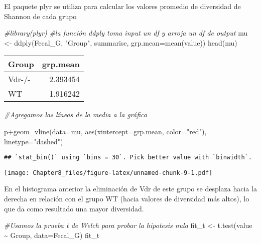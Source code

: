 \documentclass[
]{article}
\newenvironment{Shaded}{\begin{snugshade}}{\end{snugshade}}
\newcommand{\AttributeTok}[1]{\textcolor[rgb]{0.77,0.63,0.00}{#1}}
\newcommand{\CommentTok}[1]{\textcolor[rgb]{0.56,0.35,0.01}{\textit{#1}}}
\newcommand{\FunctionTok}[1]{\textcolor[rgb]{0.00,0.00,0.00}{#1}}
\newcommand{\NormalTok}[1]{#1}
\newcommand{\OtherTok}[1]{\textcolor[rgb]{0.56,0.35,0.01}{#1}}
\newcommand{\SpecialCharTok}[1]{\textcolor[rgb]{0.00,0.00,0.00}{#1}}
\newcommand{\StringTok}[1]{\textcolor[rgb]{0.31,0.60,0.02}{#1}}
\begin{document}
El paquete plyr se utiliza para calcular los valores promedio de
diversidad de Shannon de cada grupo

\begin{Shaded}
\begin{Highlighting}[]
\CommentTok{\#library(plyr)}
\CommentTok{\#la función ddply toma input un df y arroja un df de output}
\NormalTok{mu }\OtherTok{\textless{}{-}} \FunctionTok{ddply}\NormalTok{(Fecal\_G, }\StringTok{"Group"}\NormalTok{, summarise, }\AttributeTok{grp.mean=}\FunctionTok{mean}\NormalTok{(value))}
\FunctionTok{head}\NormalTok{(mu)}
\end{Highlighting}
\end{Shaded}

\begin{longtable}[]{@{}lr@{}}
\toprule()
Group & grp.mean \\
\midrule()
\endhead
Vdr-/- & 2.393454 \\
WT & 1.916242 \\
\bottomrule()
\end{longtable}

\begin{Shaded}
\begin{Highlighting}[]
\CommentTok{\#Agregamos las líneas de la media a la gráfica}

\NormalTok{p}\SpecialCharTok{+}\FunctionTok{geom\_vline}\NormalTok{(}\AttributeTok{data=}\NormalTok{mu, }\FunctionTok{aes}\NormalTok{(}\AttributeTok{xintercept=}\NormalTok{grp.mean, }\AttributeTok{color=}\StringTok{"red"}\NormalTok{),}
             \AttributeTok{linetype=}\StringTok{"dashed"}\NormalTok{)}
\end{Highlighting}
\end{Shaded}

\begin{verbatim}
## `stat_bin()` using `bins = 30`. Pick better value with `binwidth`.
\end{verbatim}

\texttt{[image: Chapter8\_files/figure-latex/unnamed-chunk-9-1.pdf]}

En el histograma anterior la eliminación de Vdr de este grupo se
desplaza hacia la derecha en relación con el grupo WT (hacia valores de
diversidad más altos), lo que da como resultado una mayor diversidad.

\begin{Shaded}
\begin{Highlighting}[]
\CommentTok{\#Usamos la prueba t de Welch para probar la hipotesis nula}
\NormalTok{fit\_t }\OtherTok{\textless{}{-}} \FunctionTok{t.test}\NormalTok{(value }\SpecialCharTok{\textasciitilde{}}\NormalTok{ Group, }\AttributeTok{data=}\NormalTok{Fecal\_G)}
\NormalTok{fit\_t}
\end{Highlighting}
\end{Shaded}
\end{document}
